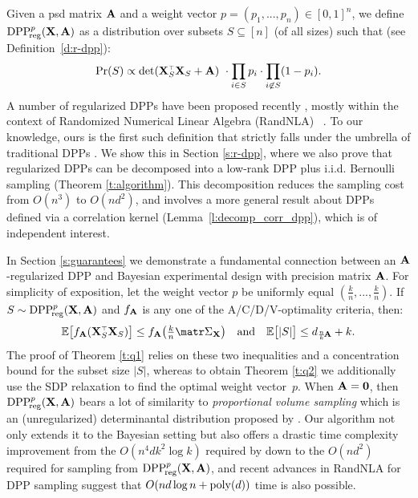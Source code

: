 \documentclass[../../thesis.tex]{subfiles}
\begin{document}
Given a psd matrix $\mathbf A$ and a weight vector $p=(p_1,...,p_n)\in[0,1]^n$, we
define ${{\mathrm{DPP}}_{\!\mathrm{reg}}^{p}}(\mathbf X,\mathbf A)$ as a distribution over subsets $S\subseteq[n]$ (of all
sizes) such that (see Definition~\ref{d:r-dpp}):
\begin{align*}
  \Pr(S)\propto \det(
  \X_S^\top\X_S+\A)\ \cdot \prod_{i\in S}p_{i}\cdot\prod_{i\not\in
    S}(1-p_i).
\end{align*}
A number of regularized DPPs have been proposed recently
\citep{dpp-intermediate,regularized-volume-sampling}, mostly within the context
of Randomized Numerical Linear Algebra (RandNLA)~
\citep{Mah-mat-rev_JRNL,DM16_CACM,RandNLA_PCMIchapter_TR}.
To our knowledge, ours is the first such definition that strictly falls
under the umbrella of traditional DPPs \citep{dpp-ml}.
We show this in Section \ref{s:r-dpp}, where we also prove that
regularized DPPs can be decomposed into a low-rank DPP plus
i.i.d. Bernoulli sampling (Theorem \ref{t:algorithm}). This decomposition reduces
the sampling cost from $O(n^3)$ to $O(nd^2)$,
and involves a more general result about DPPs defined via a
correlation kernel (Lemma~\ref{l:decomp_corr_dpp}), which is of
independent interest.

In Section \ref{s:guarantees} we demonstrate a fundamental connection between an
$\mathbf A$-regularized DPP and Bayesian experimental design with precision
matrix $\mathbf A$. For simplicity of exposition, let the weight vector $p$ be uniformly equal $(\frac kn,...,\frac kn)$. If
$S\sim{{\mathrm{DPP}}_{\!\mathrm{reg}}^{p}}(\mathbf X,\mathbf A)$ and $f_{\mathbf A}$ is any one of the
A/C/D/V-optimality criteria, then:
\begin{align*}
  \E\big[f_{\A}(\X_S^\top\X_S)\big]
  \leq f_{\A}\big(\tfrac kn\Sigmab_{\X}\big)
  \quad\text{and}\quad \E\big[|S|\big]
  \leq d_{\frac nk\!\A}+k.
\end{align*}
The proof of Theorem \ref{t:q1} relies on these two inequalities and a
concentration bound for the subset size $|S|$,
whereas to obtain Theorem
\ref{t:q2} we additionally use the SDP relaxation to find the optimal
weight vector~$p$. When $\mathbf A=\mathbf 0$, then ${{\mathrm{DPP}}_{\!\mathrm{reg}}^{p}}(\mathbf X,\mathbf A)$ bears a
lot of similarity to
\emph{proportional volume sampling} which is an (unregularized) determinantal
distribution proposed by \cite{proportional-volume-sampling}.
Our algorithm not only extends it to the Bayesian setting but also
offers a drastic time complexity improvement from
the $O(n^4dk^2\log k)$ required by \cite{proportional-volume-sampling}
down to the $O(nd^2)$ required for sampling from ${{\mathrm{DPP}}_{\!\mathrm{reg}}^{p}}(\mathbf X,\mathbf A)$,
and recent advances in RandNLA for DPP sampling
\citep{leveraged-volume-sampling,correcting-bias,dpp-intermediate} suggest that
$O(nd\log n + {\mathrm{poly}}(d))$ time is also possible.
\end{document}
